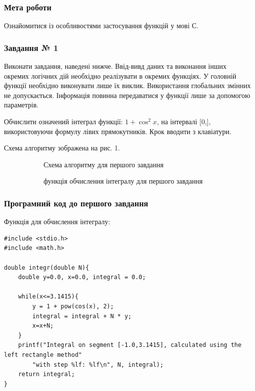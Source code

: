 \documentclass[12pt]{extreport}
\begin{document}


\subsubsection*{Мета роботи}
Ознайомитися із особливостями застосування функцій у мові С.

\bigskip
\subsubsection*{Завдання № 1}
Виконати завдання, наведені нижче. Ввід-вивд даних та виконання інших
окремих логічних дій необхідно реалізувати в окремих функціях. У головній
функції необхідно виконувати лише їх виклик. Використання глобальних
змінних не допускається. Інформація повинна передаватися у функції лише за
допомогою параметрів.

Обчислити означений інтеграл функції: $1 + \cos^2x$, на інтервалі [0,\pi],
використовуючи формулу лівих прямокутників. Крок вводити з клавіатури.

\bigskip
Схема алгоритму зображена на рис. 1.

\begin{figure}[h]
\begin{subfigure}{.5\textwidth}
	\centering
	
	\caption{Схема алгоритму для першого завдання}
\end{subfigure}
\hfill
\begin{subfigure}{.5\textwidth}
	\centering
	
	\caption{функція обчислення інтегралу для першого завдання}
\end{subfigure}
	\caption{}
\end{figure}
\subsubsection*{Програмний код до першого завдання}

Функція для обчислення інтегралу:
\begin{lstlisting}[frame=single]
#include <stdio.h>
#include <math.h>

double integr(double N){
	double y=0.0, x=0.0, integral = 0.0;

	while(x<=3.1415){
		y = 1 + pow(cos(x), 2);
		integral = integral + N * y;
		x=x+N;
	}
	printf("Integral on segment [-1.0,3.1415], calculated using the left rectangle method"
		"with step %lf: %lf\n", N, integral);
	return integral;
}
\end{lstlisting}
\end{document}
